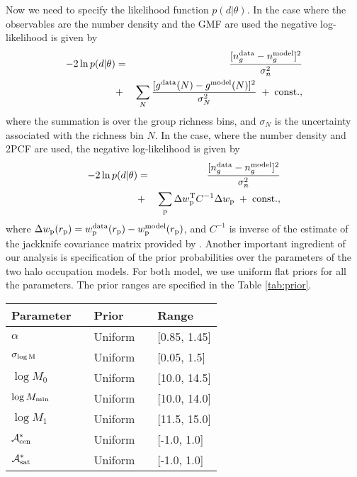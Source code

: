 \documentclass[12pt, preprint]{emulateapj}
\newcommand{\wpp}{w_{\rm p}}
\newcommand{\rpp}{r_{\rm p}}
\newcommand{\mzero}{\log M_{0}}
\newcommand{\mone}{\log M_{1}}
\newcommand{\mmin}{\log M_{\rm min}}
\newcommand{\sigmam}{\sigma_{\log \rm M}}
\newcommand{\acen}{\mathcal{A}_{\rm cen}}
\newcommand{\asat}{\mathcal{A}_{\rm sat}}
\begin{document}
Now we need to specify the likelihood function $p(d|\theta)$. In the case where the observables are the number density and the GMF are used the negative log-likelihood is given by
\begin{eqnarray}
-2\ln p(d|\theta) &=& \frac{[n^{\rm data}_{g}-n^{\rm model}_{g}]^{2}}{\sigma_{n}^{2}} \nonumber \\ &+& \sum_{N} \frac{[ g^{\rm data}(N)-g^{\rm model}(N)]^{2}}{\sigma^{2}_{N}} \; + \; \rm{const.},
\label{eq:lnlike_group}
\end{eqnarray}
where the summation is over the group richness bins, and $\sigma_{N}$ is the uncertainty associated with the richness bin $N$. In the case, where the number density and 2PCF are used, the negative log-likelihood is given by
\begin{eqnarray}
-2\ln p(d|\theta) &=& \frac{[n^{\rm data}_{g}-n^{\rm model}_{g}]^{2}}{\sigma_{n}^{2}} \nonumber \\  
&+&  \sum_{\rm p} \Delta \wpp^{\rm T}C^{-1}\Delta \wpp \; + \; \rm{const.},
\label{eq:lnlike_wp}
\end{eqnarray}
where $\Delta \wpp(\rpp) = \wpp^{\rm data}(\rpp)-\wpp^{\rm model}(\rpp)$, and  $C^{-1}$ is inverse of the estimate of the jackknife covariance matrix provided by \citealt{guo15}. 
Another important ingredient of our analysis is specification of the prior probabilities over the parameters of the two halo occupation models. For both model, we use uniform flat priors for all the parameters. The prior ranges are specified in the Table \ref{tab:prior}. 

\begin{table*}
\begin{center}
  \label{tab:prior}
  \caption{{\bf Prior Specifications}: The prior probability distribution 
  and its range for each of the parameters. 
  All mass parameters are in unit of $h^{-1}M_\odot$. The parameters marked by $*$ are only used in the Heaviside Assembly bias modeling.}
\begin{tabular}{@{}lllll}
\\ \hline 
    Parameter & & Prior & & Range \\ \hline
  $\alpha$ & & Uniform & & [0.85, 1.45] \\
  $\sigmam$ & & Uniform & &  [0.05, 1.5] \\
   $\mzero$   & & Uniform & &  [10.0, 14.5] \\
  $\mmin$ & &   Uniform & &  [10.0, 14.0] \\
  $\mone$ & & Uniform & & [11.5, 15.0] \\ 
  $\acen^{*}$ & & Uniform & & [-1.0, 1.0] \\
  $\asat^{*}$ & & Uniform & & [-1.0, 1.0] \\
 \hline
  \end{tabular}
\end{center}
\end{table*}
\end{document}
